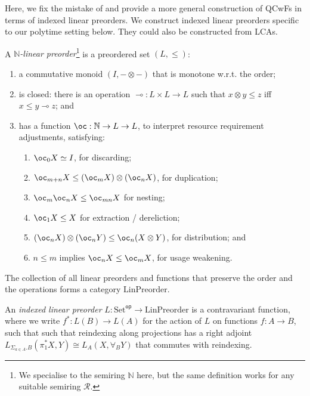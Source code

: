 \documentclass[acmsmall,screen]{acmart}
\newcommand{\Set}{\mathrm{Set}}
\newcommand{\op}{\mathsf{op}}
\newcommand{\LinPreorder}{\mathrm{LinPreorder}}
\begin{document}
Here, we fix the mistake of \citet{atkey18qtt} and provide a more
general construction of QCwFs in terms of indexed linear preorders. We
construct indexed linear preorders specific to our polytime setting
below. They could also be constructed from LCAs.

\begin{definition}\label{def:indexed-linear-preorder}
  A \emph{$\mathbb{N}$-linear preorder}\footnote{We specialise to the semiring $\mathbb{N}$ here, but the same definition works for any suitable semiring $\mathcal{R}$.} is a preordered set
  $(L, \leq)$:
  \begin{enumerate}
  \item a commutative monoid $(I, -\otimes-)$ that is monotone
    w.r.t. the order;
  \item is closed: there is an operation
    $\multimap : L \times L \to L$ such that $x \otimes y \leq z$ iff
    $x \leq y \multimap z$; and
  \item has a function $\oc : \mathbb{N} \to L \to L$, to interpret
    resource requirement adjustments, satisfying:
    \begin{enumerate}
    \item $\oc_0 X \simeq I$, for discarding;
    \item $\oc_{m+n} X \leq (\oc_m X) \otimes (\oc_n X)$, for duplication;
    \item $\oc_m\oc_n X \leq \oc_{mn} X$ for nesting;
    \item $\oc_1 X \leq X$ for extraction / dereliction;
    \item $(\oc_n X) \otimes (\oc_n Y) \leq \oc_n(X \otimes Y)$, for distribution; and
    \item $n \leq m$ implies $\oc_n X \leq \oc_m X$, for usage weakening.
    \end{enumerate}
  \end{enumerate}
  The collection of all linear preorders and functions that preserve the
  order and the operations forms a category $\LinPreorder$.

  An \emph{indexed linear preorder} $L : \Set^\op \to \LinPreorder$ is
  a contravariant function, where we write $f^* : L(B) \to L(A)$ for
  the action of $L$ on functions $f : A \to B$, such that such that
  reindexing along projections has a right adjoint
  $L_{\Sigma_{a \in A}.B}(\pi_1^*X, Y) \cong L_{A}(X, \forall_B Y)$
  that commutes with reindexing.
\end{definition}
\end{document}

